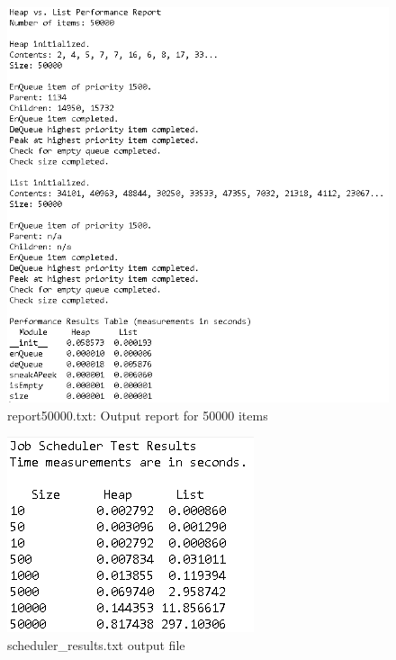 \documentclass{article}
\begin{document}
\begin{figure}[H]
    \centering
    \includegraphics{report50000.PNG}
    \caption{report50000.txt: Output report for 50000 items}
\end{figure}
\begin{figure}[H]
    \centering
    \includegraphics{scheduler_results.PNG}
    \caption{scheduler\_results.txt output file}
\end{figure}
\end{document}
